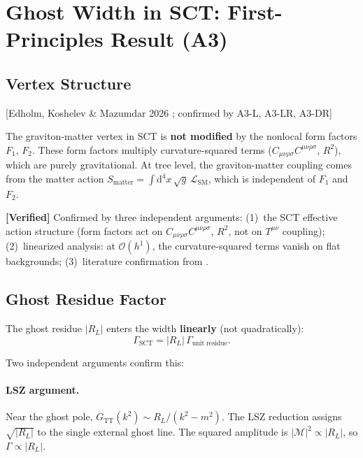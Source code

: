 \documentclass[11pt,a4paper]{article}
\theoremstyle{plain}
\theoremstyle{definition}
\theoremstyle{remark}
\newcommand{\Rsq}{R^2}
\newcommand{\Weylsq}{C_{\mu\nu\rho\sigma}C^{\mu\nu\rho\sigma}}
\newcommand{\dd}{\mathrm{d}}
\newcommand{\order}{\mathcal{O}}
\newcommand{\fromlit}[1]{\textcolor{blue!70!black}{\textsf{[#1]}}}
\newcommand{\verified}[1]{%
  \par\smallskip\noindent
  \colorbox{green!10}{\parbox{\dimexpr\linewidth-2\fboxsep}{%
    \textcolor{green!50!black}{\textbf{[Verified]}} #1}}%
  \par\smallskip}
\begin{document}
\section{Ghost Width in SCT: First-Principles Result (A3)}
\label{sec:A3}

\subsection{Vertex Structure}

\fromlit{Edholm, Koshelev \& Mazumdar 2026 \cite{EKM2026};
confirmed by A3-L, A3-LR, A3-DR}

The graviton-matter vertex in SCT is \textbf{not modified} by the
nonlocal form factors $F_1$, $F_2$.  These form factors multiply
curvature-squared terms ($\Weylsq$, $\Rsq$), which are purely
gravitational.  At tree level, the graviton-matter coupling comes
from the matter action $S_{\mathrm{matter}} = \int \dd^4x\,\sqrt{g}\,
\mathcal{L}_{\mathrm{SM}}$, which is independent of $F_1$ and $F_2$.

\verified{Confirmed by three independent arguments:
(1)~the SCT effective action structure (form factors act on
$\Weylsq$, $\Rsq$, not on $T^{\mu\nu}$ coupling);
(2)~linearized analysis: at $\order(h^1)$, the curvature-squared
terms vanish on flat backgrounds;
(3)~literature confirmation from \cite{EKM2026}.}

\subsection{Ghost Residue Factor}

The ghost residue $|R_L|$ enters the width \textbf{linearly}
(not quadratically):
\begin{equation}\label{eq:residue-factor}
  \Gamma_{\mathrm{SCT}} = |R_L|\,\Gamma_{\mathrm{unit\;residue}}.
\end{equation}

Two independent arguments confirm this:

\paragraph{LSZ argument.} Near the ghost pole, $G_{\mathrm{TT}}(k^2)
\sim R_L/(k^2 - m^2)$.  The LSZ reduction assigns $\sqrt{|R_L|}$ to
the single external ghost line.  The squared amplitude is
$|\mathcal{M}|^2 \propto |R_L|$, so $\Gamma \propto |R_L|$.
\end{document}
